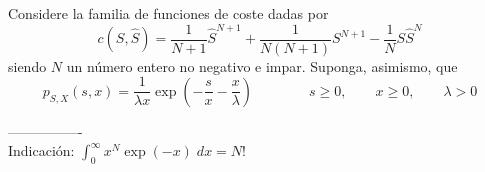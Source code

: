 \ifspanish

\question Considere la familia de funciones de coste dadas por 
$$
c(S,\hat{S})
    = \frac{1}{N+1} \hat{S}^{N+1} + \frac{1}{N(N+1)} S^{N+1} - \frac1N S \hat{S}^N
$$
siendo $N$ un número entero no negativo e impar. Suponga, asimismo, que
$$
p_{S,X}(s,x) = \frac{1}{\lambda x} \exp\left(-\frac{s}{x} -\frac{x}{\lambda} \right)
\qquad \qquad s \ge 0, \qquad x \ge 0, \qquad \lambda>0 
$$
 
----------------\\
Indicación:  $\int_{0}^{\infty} {x^N} \exp(-x)\; dx=N!$

